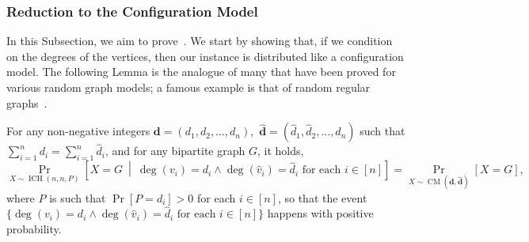 \documentclass[11pt]{article}
\DeclareMathOperator*{\CM}{CM}
\DeclareMathOperator*{\irregularcuckoohashing}{ICH}
\begin{document}
\subsubsection{Reduction to the Configuration Model}\label{sec:red_conf_mod}
In this Subsection, we aim to prove~.
We start by showing that, if we condition on the degrees of the vertices, then our instance is distributed like a configuration model.
The following Lemma is the analogue of many that have been proved for various random graph models; a famous example is that of random regular graphs~\cite{jlr11}.
\begin{lemmarep}\label{lem:reduction-conf-model}For any non-negative integers $\mathbf{d}=(d_1, d_2, \dots, d_n),$ $\mathbf{\hat{d}}=(\hat{d}_1, \hat{d}_2, \dots, \hat{d}_n)$ such that $\sum_{i=1}^n d_i = \sum_{i=1}^n\hat{d}_i$, and for any bipartite graph $G$, it holds,
\[
\Pr_{X \sim \irregularcuckoohashing(n,n,P)}\left[X = G \ \middle| \ \deg(v_i)=d_i\wedge \deg(\hat{v}_i)=\hat{d}_i\text{ for each $i\in[n]$}\right] = \Pr_{X \sim \CM(\mathbf{d}, \mathbf{\hat{d}})}[X = G],
\]
where $P$ is such that $\Pr[P=d_i]>0$ for each $i\in[n]$, so that the event $\{\deg(v_i)=d_i\wedge\deg(\hat{v}_i)=\hat{d}_i\text{ for each $i\in[n]$}\}$ happens with positive probability. 
\end{lemmarep}
\end{document}
